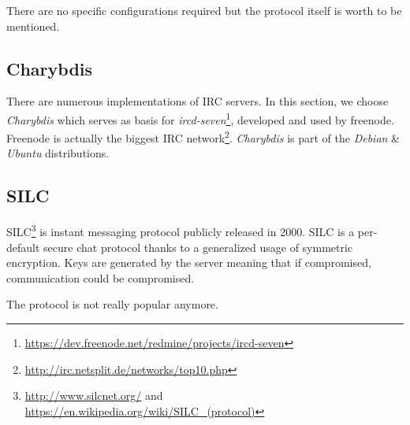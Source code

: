 There are no specific configurations required but the protocol itself is worth to be mentioned.


\subsection{Charybdis}
There are numerous implementations of IRC servers.  In this section, we choose \emph{Charybdis} which serves as basis for \emph{ircd-seven}\footnote{\url{https://dev.freenode.net/redmine/projects/ircd-seven}}, developed and used by freenode. Freenode is actually the biggest IRC network\footnote{\url{http://irc.netsplit.de/networks/top10.php}}. \emph{Charybdis} is part of the \emph{Debian} \& \emph{Ubuntu} distributions.


\subsection{SILC}

SILC\footnote{\url{http://www.silcnet.org/} and
\url{https://en.wikipedia.org/wiki/SILC_(protocol)}} is instant messaging
protocol publicly released in 2000. SILC is a per-default secure chat protocol
thanks to a generalized usage of symmetric encryption. Keys are generated by
the server meaning that if compromised, communication could be compromised.

The protocol is not really popular anymore.

